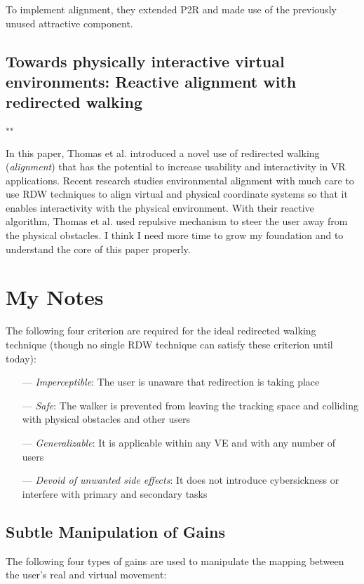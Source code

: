 \documentclass[12pt]{article}
\begin{document}
To implement alignment, they extended P2R and made use of the previously unused attractive component.

\subsection{Towards physically interactive virtual environments: Reactive alignment with redirected walking}
\textbf{\cite{thomas2020towards}}\textsuperscript{**}

In this paper, Thomas et al. introduced a novel use of redirected walking (\emph{alignment}) that has the potential to increase usability and interactivity in VR applications. Recent research studies environmental alignment with much care to use RDW techniques to align virtual and physical coordinate systems so that it enables interactivity with the physical environment. With their reactive algorithm, Thomas et al. used repulsive mechanism to steer the user away from the physical obstacles. I think I need more time to grow my foundation and to understand the core of this paper properly.

\section{My Notes}

The following four criterion are required for the ideal redirected walking technique (though no single RDW technique can satisfy these criterion until today):

\begin{itemize}[noitemsep]
    \item[---] \emph{Imperceptible}: The user is unaware that redirection is taking place
    \item[---] \emph{Safe}: The walker is prevented from leaving the tracking space and colliding with physical obstacles and other users
    \item[---] \emph{Generalizable}: It is applicable within any VE and with any number of users
    \item[---] \emph{Devoid of unwanted side effects}: It does not introduce cybersickness or interfere with primary and secondary tasks
\end{itemize}

\subsection{Subtle Manipulation of Gains}

The following four types of gains are used to manipulate the mapping between the user's real and virtual movement:
\end{document}
